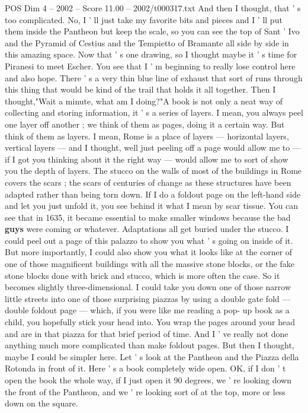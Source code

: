 \begin{textsample}{POS Dim 4 – 2002 – Score 11.00 – 2002/t000317.txt}
And then I thought, that ' s too complicated.
No, I ' ll just take my favorite bits and pieces and I ' ll put them inside the Pantheon but keep the scale, so you can see the top of Sant ' Ivo and the Pyramid of Cestius and the Tempietto of Bramante all side by side in this amazing space.
Now that ' s one drawing, so I thought maybe it ' s time for Piranesi to meet Escher.
You see that I ' m beginning to really lose control here and also hope.
There ' s a very thin blue line of exhaust that sort of runs through this thing that would be kind of the trail that holds it all together.
Then I thought,"Wait a minute, what am I doing?"A book is not only a neat way of collecting and storing information, it ' s a series of layers.
I mean, you always peel one layer off another ; we think of them as pages, doing it a certain way.
But think of them as layers.
I mean, Rome is a place of layers — horizontal layers, vertical layers — and I thought, well just peeling off a page would allow me to — if I got you thinking about it the right way — would allow me to sort of show you the depth of layers.
The stucco on the walls of most of the buildings in Rome covers the scars ; the scars of centuries of change as these structures have been adapted rather than being torn down.
If I do a foldout page on the left-hand side and let you just unfold it, you see behind it what I mean by scar tissue.
You can see that in 1635, it became essential to make smaller windows because the bad \textbf{guys} were coming or whatever.
Adaptations all get buried under the stucco.
I could peel out a page of this palazzo to show you what ' s going on inside of it.
But more importantly, I could also show you what it looks like at the corner of one of those magnificent buildings with all the massive stone blocks, or the fake stone blocks done with brick and stucco, which is more often the case.
So it becomes slightly three-dimensional.
I could take you down one of those narrow little streets into one of those surprising piazzas by using a double gate fold — double foldout page — which, if you were like me reading a pop- up book as a child, you hopefully stick your head into.
You wrap the pages around your head and are in that piazza for that brief period of time.
And I ' ve really not done anything much more complicated than make foldout pages.
But then I thought, maybe I could be simpler here.
Let ' s look at the Pantheon and the Piazza della Rotonda in front of it.
Here ' s a book completely wide open.
OK, if I don ' t open the book the whole way, if I just open it 90 degrees, we ' re looking down the front of the Pantheon, and we ' re looking sort of at the top, more or less down on the square.

\end{textsample}
